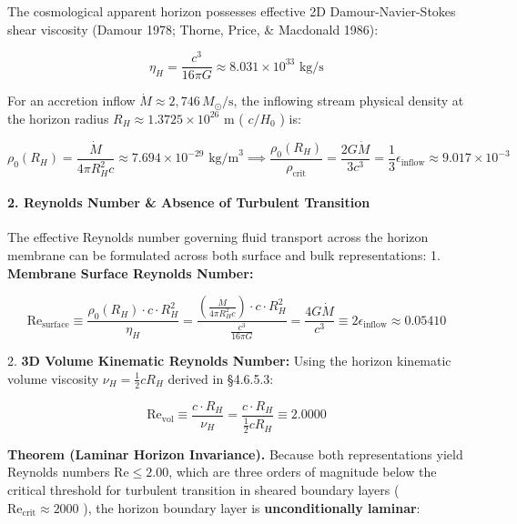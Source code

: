 \documentclass[11pt,a4paper]{article}
\theoremstyle{definition}\newtheorem{definition}{Definition}
\theoremstyle{remark}\newtheorem{remark}{Remark}
\begin{document}
The cosmological apparent horizon possesses effective 2D Damour-Navier-Stokes shear viscosity (Damour 1978; Thorne, Price, \& Macdonald 1986):


\begin{equation}
\eta_H = \frac{c^3}{16\pi G} \approx 8.031 \times 10^{33}\text{ kg/s}
\end{equation}


For an accretion inflow $\dot{M} \approx 2{,}746\,M_\odot/\text{s}$, the inflowing stream physical density at the horizon radius $R_H \approx 1.3725 \times 10^{26}\text{ m}$ ( $c/H_0$ ) is:


\begin{equation}
\rho_0(R_H) = \frac{\dot{M}}{4\pi R_H^2 c} \approx 7.694 \times 10^{-29}\text{ kg/m}^3 \implies \frac{\rho_0(R_H)}{\rho_{\text{crit}}} = \frac{2 G \dot{M}}{3 c^3} = \frac{1}{3}\epsilon_{\text{inflow}} \approx 9.017 \times 10^{-3}
\end{equation}

\paragraph{2. Reynolds Number \& Absence of Turbulent Transition}

The effective Reynolds number governing fluid transport across the horizon membrane can be formulated across both surface and bulk representations:
1. \textbf{Membrane Surface Reynolds Number:}


\begin{equation}
\mathrm{Re}_{\text{surface}} \equiv \frac{\rho_0(R_H) \cdot c \cdot R_H^2}{\eta_H} = \frac{(\frac{\dot{M}}{4\pi R_H^2 c}) \cdot c \cdot R_H^2}{\frac{c^3}{16\pi G}} = \frac{4 G \dot{M}}{c^3} \equiv 2\epsilon_{\text{inflow}} \approx 0.05410
\end{equation}


2. \textbf{3D Volume Kinematic Reynolds Number:}
Using the horizon kinematic volume viscosity $\nu_H = \frac{1}{2} c R_H$ derived in §4.6.5.3:


\begin{equation}
\mathrm{Re}_{\text{vol}} \equiv \frac{c \cdot R_H}{\nu_H} = \frac{c \cdot R_H}{\frac{1}{2} c R_H} \equiv 2.0000
\end{equation}


\textbf{Theorem (Laminar Horizon Invariance).} Because both representations yield Reynolds numbers $\mathrm{Re} \le 2.00$, which are three orders of magnitude below the critical threshold for turbulent transition in sheared boundary layers ( $\mathrm{Re}_{\text{crit}} \approx 2000$ ), the horizon boundary layer is \textbf{unconditionally laminar}:
\end{document}
